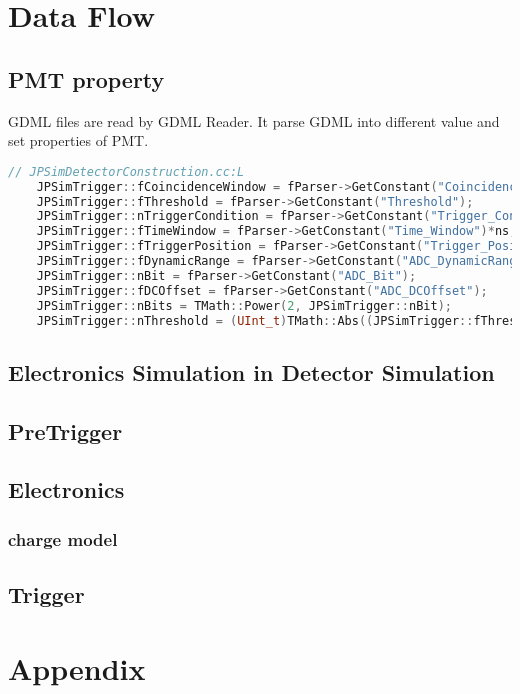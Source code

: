 \section{Data Flow}
\subsection{PMT property}
GDML files are read by GDML Reader. It parse GDML into different value and set properties of PMT.
\begin{lstlisting}[language=c++]
    // JPSimDetectorConstruction.cc:L
    JPSimTrigger::fCoincidenceWindow = fParser->GetConstant("Coincidence_Window")*ns;
    JPSimTrigger::fThreshold = fParser->GetConstant("Threshold");
    JPSimTrigger::nTriggerCondition = fParser->GetConstant("Trigger_Condition");
    JPSimTrigger::fTimeWindow = fParser->GetConstant("Time_Window")*ns;
    JPSimTrigger::fTriggerPosition = fParser->GetConstant("Trigger_Position")*ns;
    JPSimTrigger::fDynamicRange = fParser->GetConstant("ADC_DynamicRange");
    JPSimTrigger::nBit = fParser->GetConstant("ADC_Bit");
    JPSimTrigger::fDCOffset = fParser->GetConstant("ADC_DCOffset");
    JPSimTrigger::nBits = TMath::Power(2, JPSimTrigger::nBit);
    JPSimTrigger::nThreshold = (UInt_t)TMath::Abs((JPSimTrigger::fThreshold+JPSimTrigger::fDCOffset*1000+1000*JPSimTrigger::fDynamicRange)/(JPSimTrigger::fDynamicRange*1000/JPSimTrigger::nBits));
\end{lstlisting}
\subsection{Electronics Simulation in Detector Simulation}
\subsection{PreTrigger}
\subsection{Electronics}
\subsubsection{charge model}
\subsection{Trigger}

\section{Appendix}